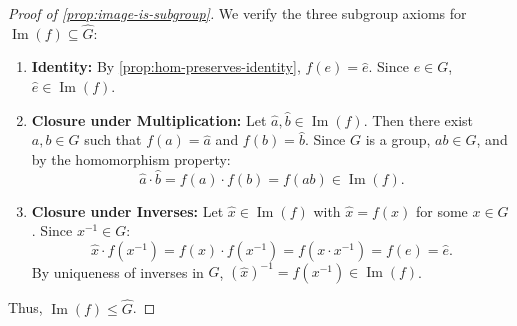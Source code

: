 \begin{content}


\begin{proof}[Proof of \cref{prop:image-is-subgroup}]
We verify the three subgroup axioms for $\operatorname{Im}(f) \subseteq \hat{G}$:
\begin{enumerate}[label=\textbf{(\arabic*)}]
    \item \textbf{Identity:} By \cref{prop:hom-preserves-identity}, $f(e) = \hat{e}$. Since $e \in G$, $\hat{e} \in \operatorname{Im}(f)$.
    \item \textbf{Closure under Multiplication:} Let $\hat{a}, \hat{b} \in \operatorname{Im}(f)$. Then there exist $a, b \in G$ such that $f(a) = \hat{a}$ and $f(b) = \hat{b}$. Since $G$ is a group, $ab \in G$, and by the homomorphism property:
    \[
    \hat{a} \cdot \hat{b} = f(a) \cdot f(b) = f(ab) \in \operatorname{Im}(f).
    \]
    \item \textbf{Closure under Inverses:} Let $\hat{x} \in \operatorname{Im}(f)$ with $\hat{x} = f(x)$ for some $x \in G$. Since $x^{-1} \in G$:
    \[
    \hat{x} \cdot f(x^{-1}) = f(x) \cdot f(x^{-1}) = f(x \cdot x^{-1}) = f(e) = \hat{e}.
    \]
    By uniqueness of inverses in $\hat{G}$, $(\hat{x})^{-1} = f(x^{-1}) \in \operatorname{Im}(f)$.
\end{enumerate}
Thus, $\operatorname{Im}(f) \le \hat{G}$.
\end{proof}
\end{content}

\begin{hidden}
\end{hidden}

